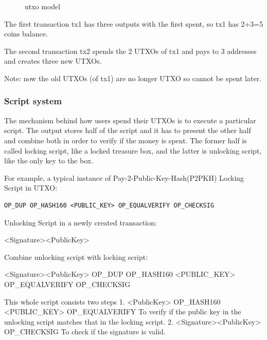 \documentclass[a4paper,11pt]{article}
\begin{document}
\begin{figure}[hbt]
	\centerline{%
	}
\caption{utxo model}
\end{figure}

The first transaction tx1 has three outputs with the first spent, so  tx1 has 2+3=5 coins balance.

The second transaction tx2 spends the 2 UTXOs of tx1 and pays to 3 addresses and creates three new UTXOs.

Note: now the old UTXOs (of tx1) are no longer UTXO so cannot be spent later.

\subsubsection*{Script system}

The mechanism behind how users spend their UTXOs is to execute a particular script. The output stores half of the script and it has to present the other half and combine both in order to verify if the money is spent. The former half is called locking script, like a locked treasure box, and the latter is unlocking script, like the only key to the box.

For example, a typical instance of  Pay-2-Public-Key-Hash(P2PKH)\cite{P2PKH} Locking Script in UTXO:

\begin{lstlisting}
OP_DUP OP_HASH160 <PUBLIC_KEY> OP_EQUALVERIFY OP_CHECKSIG
\end{lstlisting}

Unlocking Script in a newly created transaction:

<Signature><PublicKey>

Combine unlocking script with locking script:

<Signature><PublicKey> OP\_DUP OP\_HASH160 <PUBLIC\_KEY> OP\_EQUALVERIFY OP\_CHECKSIG

This whole script consists two steps
1. <PublicKey>  OP\_HASH160 <PUBLIC\_KEY> OP\_EQUALVERIFY
	To verify if the public key in the unlocking script matches that in the locking script.
2.  <Signature><PublicKey> OP\_CHECKSIG
	To check if the signature is valid.
\end{document}
